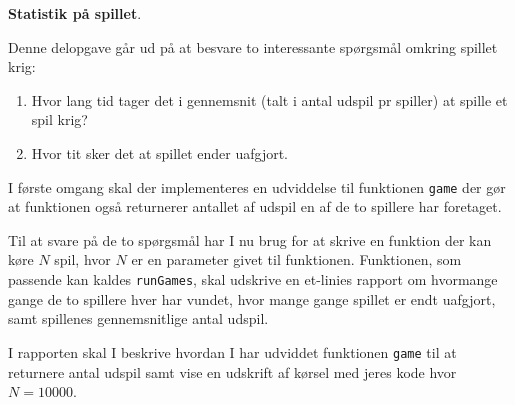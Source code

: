 \textbf{Statistik på spillet}.

Denne delopgave går ud på at besvare to interessante spørgsmål omkring
spillet krig:

\begin{enumerate}
\item Hvor lang tid tager det i gennemsnit (talt i antal udspil pr spiller) at spille et spil krig?
\item Hvor tit sker det at spillet ender uafgjort.
\end{enumerate}

I første omgang skal der implementeres en udviddelse til
funktionen \lstinline{game} der gør at funktionen også returnerer
antallet af udspil en af de to spillere har foretaget.

Til at svare på de to spørgsmål har I nu brug for at skrive en
funktion der kan køre $N$ spil, hvor $N$ er en parameter givet til
funktionen. Funktionen, som passende kan kaldes \lstinline{runGames},
skal udskrive en et-linies rapport om hvormange gange de to spillere
hver har vundet, hvor mange gange spillet er endt uafgjort, samt
spillenes gennemsnitlige antal udspil.

I rapporten skal I beskrive hvordan I har udviddet
funktionen \lstinline{game} til at returnere antal udspil samt vise en
udskrift af kørsel med jeres kode hvor $N=10000$.
